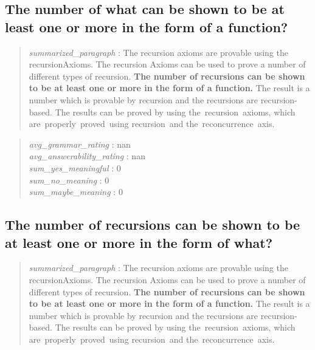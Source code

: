 \hypertarget{the-number-of-what-can-be-shown-to-be-at-least-one-or-more-in-the-form-of-a-function}{%
\subsection{The number of what can be shown to be at least one or more
in the form of a
function?}\label{the-number-of-what-can-be-shown-to-be-at-least-one-or-more-in-the-form-of-a-function}}

\begin{quote}
\emph{summarized\_paragraph} : The recursion axioms are provable using
the recursionAxioms. The recursion Axioms can be used to prove a number
of different types of recursion. \textbf{The number of recursions can be
shown to be at least one or more in the form of a function.} The result
is a number which is provable by recursion and the recursions are
recursion-based. The results can be proved by using
the~recursion~axioms, which are~properly~proved~using recursion~and
the~reconcurrence~axis.
\end{quote}

\begin{quote}
\emph{avg\_grammar\_rating} : nan\\
\emph{avg\_answerability\_rating} : nan\\
\emph{sum\_yes\_meaningful} : 0\\
\emph{sum\_no\_meaning} : 0\\
\emph{sum\_maybe\_meaning} : 0
\end{quote}

\hypertarget{the-number-of-recursions-can-be-shown-to-be-at-least-one-or-more-in-the-form-of-what}{%
\subsection{The number of recursions can be shown to be at least one or
more in the form of
what?}\label{the-number-of-recursions-can-be-shown-to-be-at-least-one-or-more-in-the-form-of-what}}

\begin{quote}
\emph{summarized\_paragraph} : The recursion axioms are provable using
the recursionAxioms. The recursion Axioms can be used to prove a number
of different types of recursion. \textbf{The number of recursions can be
shown to be at least one or more in the form of a function.} The result
is a number which is provable by recursion and the recursions are
recursion-based. The results can be proved by using
the~recursion~axioms, which are~properly~proved~using recursion~and
the~reconcurrence~axis.
\end{quote}

